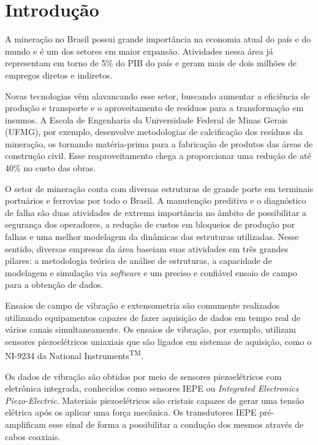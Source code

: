\documentclass[11pt]{abntex2}
\begin{document}
	\chapter{Introdução}
		A mineração no Brasil possui grande importância na economia atual do país e
		do mundo e é um dos setores em maior expansão. Atividades nessa área já
		representam em torno de 5\% do PIB do país e geram mais de dois milhões de
		empregos diretos e indiretos.\cite{pib}

		Novas tecnologias vêm alavancando esse setor, buscando aumentar a eficiência
		de produção e transporte e o aproveitamento de resíduos para a
		transformação em insumos. A Escola de Engenharia da Universidade Federal de
		Minas Gerais (UFMG), por exemplo, desenvolve metodologias de calcificação
		dos resíduos da mineração, os tornando matéria-prima para a fabricação de
		produtos das áreas de construção civil. Esse reaproveitamento chega a
		proporcionar uma redução de até 40\% no custo das obras.\cite{mineracaoUFMG}
		
		O setor de mineração conta com diversas estruturas de grande porte em
		terminais portuários e ferrovias por todo o Brasil. A manutenção
		preditiva e o diagnóstico de falha são duas atividades de extrema
		importância no âmbito de possibilitar a segurança dos operadores, a
		redução de custos em bloqueios de produção por falhas e uma melhor
		modelagem da dinâmicas das estruturas utilizadas. Nesse sentido,
		diversas empresas da área baseiam suas atividades em três grandes
		pilares: a metodologia teórica de análise de estruturas, a capacidade de
		modelagem e simulação via \textit{software} e um preciso e confiável
		ensaio de campo para a obtenção de dados.
		
		Ensaios de campo de vibração e extensometria são comumente realizados
		utilizando equipamentos capazes de fazer aquisição de dados em tempo
		real de vários canais simultaneamente. Os ensaios de vibração, por
		exemplo, utilizam sensores piezoelétricos uniaxiais que são ligados em
		sistemas de aquisição, como o NI-9234 da National
		Instruments\textsuperscript{TM}.
		
		Os dados de vibração são obtidos por meio de sensores piezoelétricos com
		eletrônica integrada, conhecidos como sensores IEPE ou \textit{Integrated
		Electronics Piezo-Electric}. Materiais piezoelétricos são cristais capazes de
		gerar uma tensão elétrica após os aplicar uma força mecânica.
		Os transdutores IEPE pré-amplificam esse sinal de forma a possibilitar a
		condução dos mesmos através de cabos coaxiais.
\end{document}
